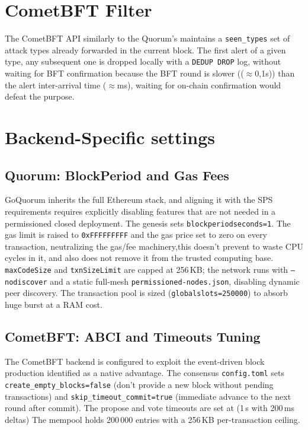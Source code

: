 \section{CometBFT Filter}
 The CometBFT API similarly to the Quorum's maintains a \texttt{seen\_types} set of attack types already forwarded in the current block. The first alert of a given type, any subsequent one is dropped locally with a \texttt{DEDUP DROP} log, without waiting for BFT confirmation because the BFT round is slower (($\approx$0,1s)) than the alert inter-arrival time ($\approx$ms), waiting for on-chain confirmation would defeat the purpose.

\section{Backend-Specific settings}
\label{sec:impl_backend_eng}

\subsection{Quorum: BlockPeriod and Gas Fees}
GoQuorum inherits the full Ethereum stack, and aligning it with the SPS requirements requires explicitly disabling features that are not needed in a permissioned closed deployment. The genesis sets \texttt{blockperiodseconds=1}. The gas limit is raised to \texttt{0xFFFFFFFFF} and the gas price set to zero on every transaction, neutralizing the gas/fee machinery,this doesn't prevent to waste CPU cycles in it, and also does not remove it from the trusted computing base. \texttt{maxCodeSize} and \texttt{txnSizeLimit} are capped at 256\,KB; the network runs with \texttt{--nodiscover} and a static full-mesh \texttt{permissioned-nodes.json}, disabling dynamic peer discovery. The transaction pool is sized (\texttt{globalslots=250000}) to absorb huge burst at a RAM cost.


\subsection{CometBFT: ABCI and Timeouts Tuning}
\label{subsec:impl_cometbft_engineering}

The CometBFT backend is configured to exploit the event-driven block production identified as a native advantage. The consensus \texttt{config.toml} sets \texttt{create\_empty\_blocks=false} (don't provide a new block without pending transactions) and \texttt{skip\_timeout\_commit=true} (immediate advance to the next round after commit). The propose and vote timeouts are set at (1\,s with 200\,ms deltas) The mempool holds 200\,000 entries with a 256\,KB per-transaction ceiling.

